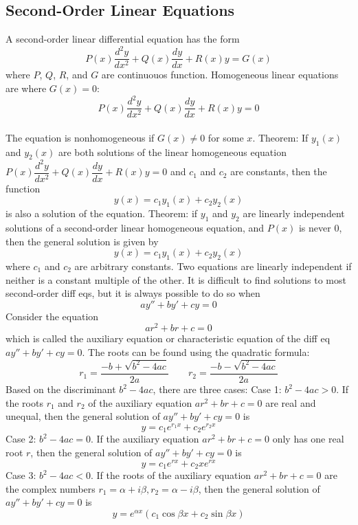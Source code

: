 \documentclass{article}
\begin{document}
    \subsection{Second-Order Linear Equations}
    \begin{outline}
        \1 A second-order linear differential equation has the form \[P(x)\dfrac{d^2y}{dx^2}+Q(x)\dfrac{dy}{dx}+R(x)y=G(x)\] where \(P\), \(Q\), \(R\), and \(G\) are continuouos function. 
        \1 Homogeneous linear equations are where \(G(x)=0\): \[P(x)\dfrac{d^2y}{dx^2}+Q(x)\dfrac{dy}{dx}+R(x)y=0\] \\The equation is nonhomogeneous if \(G(x)\neq 0\) for some $x$. 
        \1 Theorem: If \(y_1(x)\) and \(y_2(x)\) are both solutions of the linear homogeneous equation \(P(x)\dfrac{d^2y}{dx^2}+Q(x)\dfrac{dy}{dx}+R(x)y=0\) and \(c_1\) and \(c_2\) are constants, then the function \[y(x)=c_1y_1(x)+c_2y_2(x)\] is also a solution of the equation. 
        \1 Theorem: if \(y_1\) and \(y_2\) are linearly independent solutions of a second-order linear homogeneous equation, and \(P(x)\) is never \(0\), then the general solution is given by \[y(x)=c_1y_1(x)+c_2y_2(x)\] where \(c_1\) and \(c_2\) are arbitrary constants. 
        \1 Two equations are linearly independent if neither is a constant multiple of the other. 
        \1 It is difficult to find solutions to most second-order diff eqs, but it is always possible to do so when \[ay''+by'+cy=0\]
        \1 Consider the equation \[ar^2+br+c=0\] which is called the auxiliary equation or characteristic equation of the diff eq \(ay''+by'+cy=0\). The roots can be found using the quadratic formula: \[r_1=\dfrac{-b+\sqrt{b^2-4ac}}{2a}\qquad r_2=\dfrac{-b-\sqrt{b^2-4ac}}{2a}\]
        \1 Based on the discriminant \(b^2-4ac\), there are three cases: 
            \2 Case 1: \(b^2-4ac>0\). If the roots $r_1$ and $r_2$ of the auxiliary equation \(ar^2+br+c=0\) are real and unequal, then the general solution of \(ay''+by'+cy=0\) is \[y=c_1e^{r_1x}+c_2e^{r_2x}\]
            \2 Case 2: \(b^2-4ac=0\). If the auxiliary equation \(ar^2+br+c=0\) only has one real root $r$, then the general solution of \(ay''+by'+cy=0\) is \[y=c_1e^{rx}+c_2xe^{rx}\]
            \2 Case 3: \(b^2-4ac<0\). If the roots of the auxiliary equation \(ar^2+br+c=0\) are the complex numbers \(r_1=\alpha+i\beta,r_2=\alpha-i\beta\), then the general solution of \(ay''+by'+cy=0\) is \[y=e^{\alpha x}(c_1\cos\beta x+c_2\sin\beta x)\]
    \end{outline}
\end{document}

